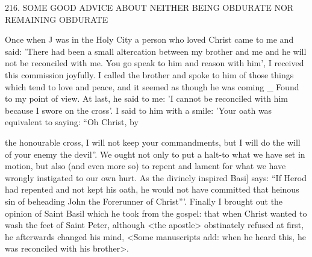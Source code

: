 216. SOME GOOD ADVICE
ABOUT NEITHER BEING OBDURATE
NOR REMAINING OBDURATE

Once when J was in the Holy City a person who loved Christ came
to me and said: 'There had been a small altercation between my
brother and me and he will not be reconciled with me. You go
speak to him and reason with him', I received this commission
joyfully. I called the brother and spoke to him of those things which
tend to love and peace, and it seemed as though he was coming
\_ Found to my point of view. At last, he said to me: 'I cannot be
reconciled with him because I swore on the cross'. I said to him
with a smile: 'Your oath was equivalent to saying: “Oh Christ, by

the honourable cross, I will not keep your commandments, but I
will do the will of your enemy the devil”. We ought not only to put
a halt-to what we have set in motion, but also (and even more so)
to repent and lament for what we have wrongly instigated to our
own hurt. As the divinely inspired Basi] says: “If Herod had
repented and not kept his oath, he would not have committed that
heinous sin of beheading John the Forerunner of Christ”'. Finally
I brought out the opinion of Saint Basil which he took from the
gospel: that when Christ wanted to wash the feet of Saint Peter,
although <the apostle> obstinately refused at first, he afterwards
changed his mind, <Some manuscripts add: when he heard this, he
was reconciled with his brother>.

